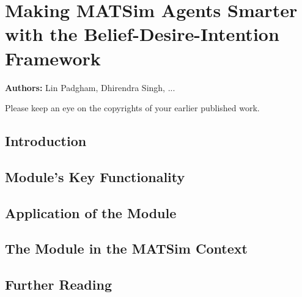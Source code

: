 \chapter{Making MATSim Agents Smarter with the Belief-Desire-Intention Framework}
\label{ch:bdi}

\hfill \textbf{Authors:} Lin Padgham, Dhirendra Singh, ...



Please keep an eye on the copyrights of your earlier published work.

\section{Introduction}

\section{Module's Key Functionality}

\section{Application of the Module}

\section{The Module in the MATSim Context}

\section{Further Reading}






